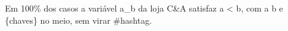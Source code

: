 Em 100\% dos casos a variável a\_b da loja C\&A satisfaz a \textless{} b, com a \textbar{} b e \{chaves\} no meio, sem virar \#hashtag.
